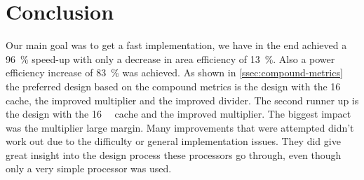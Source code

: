 \documentclass[final]{article}
\begin{document}
\section{Conclusion}
\label{sec:conclusion}
Our main goal was to get a fast implementation, we have in the end achieved a \SI{96}{\percent} speed-up with only a decrease in area efficiency of \SI{13}{\percent}.
Also a power efficiency increase of \SI{83}{\percent} was achieved.
As shown in \cref{ssec:compound-metrics} the preferred design based on the compound metrics is the design with the \SI{16}{\kibi\byte} cache, the improved multiplier and the improved divider.
The second runner up is the design with the \SI{16}{\kibi\byte} cache and the improved multiplier.
The biggest impact was the multiplier large margin.
Many improvements that were attempted didn't work out due to the difficulty or general implementation issues.
They did give great insight into the design process these processors go through, even though only a very simple processor was used.
\end{document}
